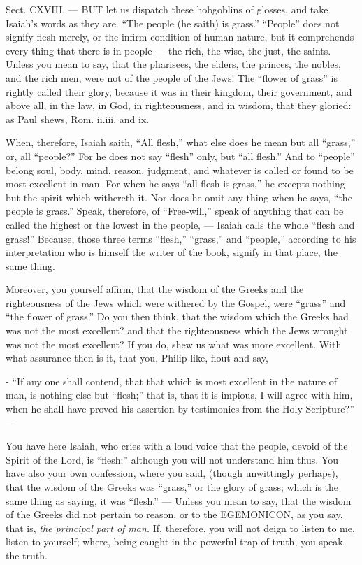 
Sect. CXVIII. — BUT let us dispatch these hobgoblins of glosses, and take Isaiah’s words as they are. “The people (he saith) is grass.” “People” does not signify flesh merely, or the infirm condition of human nature, but it comprehends every thing that there is in people — the rich, the wise, the just, the saints. Unless you mean to say, that the pharisees, the elders, the princes, the nobles, and the rich men, were not of the people of the Jews! The “flower of grass” is rightly called their glory, because it was in their kingdom, their government, and above all, in the law, in God, in righteousness, and in wisdom, that they gloried: as Paul shews, Rom. ii.iii. and ix.

When, therefore, Isaiah saith, “All flesh,” what else does he mean but all “grass,” or, all “people?” For he does not say “flesh” only, but “all flesh.” And to “people” belong soul, body, mind, reason, judgment, and whatever is called or found to be most excellent in man. For when he says “all flesh is grass,” he excepts nothing but the spirit which withereth it. Nor does he omit any thing when he says, “the people is grass.” Speak, therefore, of “Free-will,” speak of anything that can be called the highest or the lowest in the people, — Isaiah calls the whole “flesh and grass!” Because, those three terms “flesh,” “grass,” and “people,” according to his interpretation who is himself the writer of the book, signify in that place, the same thing.

Moreover, you yourself affirm, that the wisdom of the Greeks and the righteousness of the Jews which were withered by the Gospel, were “grass” and “the flower of grass.” Do you then think, that the wisdom which the Greeks had was not the most excellent? and that the righteousness which the Jews wrought was not the most excellent? If you do, shew us what was more excellent. With what assurance then is it, that you, Philip-like, flout and say,

- “If any one shall contend, that that which is most excellent in the nature of man, is nothing else but “flesh;” that is, that it is impious, I will agree with him, when he shall have proved his assertion by testimonies from the Holy Scripture?” —

You have here Isaiah, who cries with a loud voice that the people, devoid of the Spirit of the Lord, is “flesh;” although you will not understand him thus. You have also your own confession, where you said, (though unwittingly perhaps), that the wisdom of the Greeks was “grass,” or the glory of grass; which is the same thing as saying, it was “flesh.” — Unless you mean to say, that the wisdom of the Greeks did not pertain to reason, or to the \textsc{EGEMONICON}, as you say, that is, \emph{the principal part of man. }If, therefore, you will not deign to listen to me, listen to yourself; where, being caught in the powerful trap of truth, you speak the truth.

